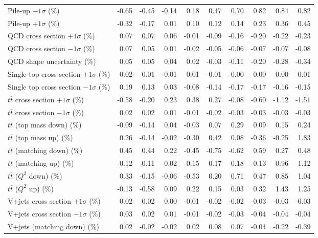\begin{table}[htbp]
{\begin{tabular}{lrrrrrrrrr}
Pile-up $-1\sigma$ (\%) & -0.65 & -0.45 & -0.14 & 0.18 & 0.47 & 0.70 & 0.82 & 0.84 & 0.82 \\ 
Pile-up $+1\sigma$ (\%) & -0.32 & -0.17 & 0.01 & 0.10 & 0.12 & 0.14 & 0.23 & 0.36 & 0.45 \\ 
QCD cross section \ensuremath{+1\sigma} (\%) & 0.07 & 0.07 & 0.06 & -0.01 & -0.09 & -0.16 & -0.20 & -0.22 & -0.23 \\ 
QCD cross section \ensuremath{-1\sigma} (\%) & 0.07 & 0.05 & 0.01 & -0.02 & -0.05 & -0.06 & -0.07 & -0.07 & -0.08 \\ 
QCD shape uncertainty (\%) & 0.05 & 0.05 & 0.04 & 0.02 & -0.03 & -0.11 & -0.20 & -0.28 & -0.34 \\ 
Single top cross section $+1\sigma$ (\%) & 0.02 & 0.01 & -0.01 & -0.01 & -0.01 & -0.00 & 0.00 & 0.00 & 0.01 \\ 
Single top cross section $-1\sigma$ (\%) & 0.19 & 0.13 & 0.03 & -0.08 & -0.14 & -0.17 & -0.17 & -0.16 & -0.15 \\ 
$t\bar{t}$ cross section $+1\sigma$ (\%) & -0.58 & -0.20 & 0.23 & 0.38 & 0.27 & -0.08 & -0.60 & -1.12 & -1.51 \\ 
$t\bar{t}$ cross section $-1\sigma$ (\%) & 0.02 & 0.02 & 0.01 & -0.01 & -0.02 & -0.03 & -0.03 & -0.03 & -0.03 \\ 
$t\bar{t}$ (top mass down) (\%) & -0.09 & -0.14 & 0.04 & -0.03 & 0.07 & 0.29 & 0.09 & 0.15 & 0.24 \\ 
$t\bar{t}$ (top mass up) (\%) & 0.26 & -0.14 & -0.02 & -0.30 & 0.42 & 0.08 & -0.36 & -0.25 & 1.83 \\ 
$t\bar{t}$ (matching down) (\%) & 0.45 & 0.44 & 0.22 & -0.45 & -0.75 & -0.62 & 0.59 & 0.27 & 0.48 \\ 
$t\bar{t}$ (matching up) (\%) & -0.12 & -0.11 & 0.02 & -0.15 & 0.17 & 0.18 & -0.13 & 0.96 & 1.12 \\ 
$t\bar{t}$ ($Q^{2}$ down) (\%) & 0.33 & -0.15 & -0.06 & -0.53 & 0.20 & 0.71 & 0.47 & 0.85 & 1.04 \\ 
$t\bar{t}$ ($Q^{2}$ up) (\%) & -0.13 & -0.58 & 0.09 & 0.22 & 0.15 & 0.03 & 0.32 & 1.43 & 1.25 \\ 
V+jets cross section \ensuremath{+1\sigma} (\%) & 0.02 & 0.02 & 0.00 & -0.01 & -0.02 & -0.02 & -0.03 & -0.03 & -0.03 \\ 
V+jets cross section \ensuremath{-1\sigma} (\%) & 0.03 & 0.02 & 0.01 & -0.01 & -0.02 & -0.03 & -0.04 & -0.04 & -0.04 \\ 
V+jets (matching down) (\%) & 0.02 & -0.02 & -0.02 & 0.02 & 0.08 & 0.07 & -0.04 & -0.22 & -0.39 \\ 

\end{tabular}}
\end{table}
